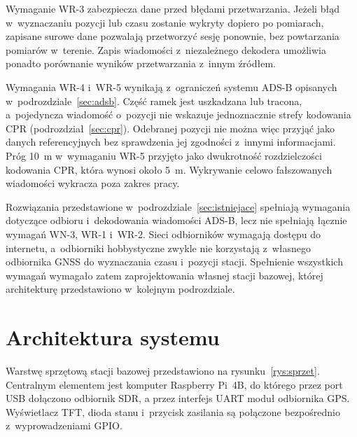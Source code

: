 Wymaganie WR-3 zabezpiecza dane przed błędami przetwarzania. Jeżeli błąd w~wyznaczaniu pozycji lub czasu zostanie wykryty dopiero po pomiarach, zapisane surowe dane pozwalają przetworzyć sesję ponownie, bez powtarzania pomiarów w~terenie. Zapis wiadomości z~niezależnego dekodera umożliwia ponadto porównanie wyników przetwarzania z~innym źródłem.

Wymagania WR-4 i~WR-5 wynikają z~ograniczeń systemu ADS-B opisanych w~podrozdziale~\ref{sec:adsb}. Część ramek jest uszkadzana lub tracona, a~pojedyncza wiadomość o~pozycji nie wskazuje jednoznacznie strefy kodowania CPR (podrozdział~\ref{sec:cpr}). Odebranej pozycji nie można więc przyjąć jako danych referencyjnych bez sprawdzenia jej zgodności z~innymi informacjami. Próg \SI{10}{m} w~wymaganiu WR-5 przyjęto jako dwukrotność rozdzielczości kodowania CPR, która wynosi około \SI{5}{m}. Wykrywanie celowo fałszowanych wiadomości wykracza poza zakres pracy.

Rozwiązania przedstawione w~podrozdziale~\ref{sec:istniejace} spełniają wymagania dotyczące odbioru i~dekodowania wiadomości ADS-B, lecz nie spełniają łącznie wymagań WN-3, WR-1 i~WR-2. Sieci odbiorników wymagają dostępu do internetu, a~odbiorniki hobbystyczne zwykle nie korzystają z~własnego odbiornika GNSS do wyznaczania czasu i~pozycji stacji. Spełnienie wszystkich wymagań wymagało zatem zaprojektowania własnej stacji bazowej, której architekturę przedstawiono w~kolejnym podrozdziale.
\section{Architektura systemu}
\label{sec:architektura}

Warstwę sprzętową stacji bazowej przedstawiono na rysunku~\ref{rys:sprzet}. Centralnym elementem jest komputer Raspberry Pi~4B, do którego przez port USB dołączono odbiornik SDR, a przez interfejs UART moduł odbiornika GPS. Wyświetlacz TFT, dioda stanu i~przycisk zasilania są połączone bezpośrednio z~wyprowadzeniami GPIO.

